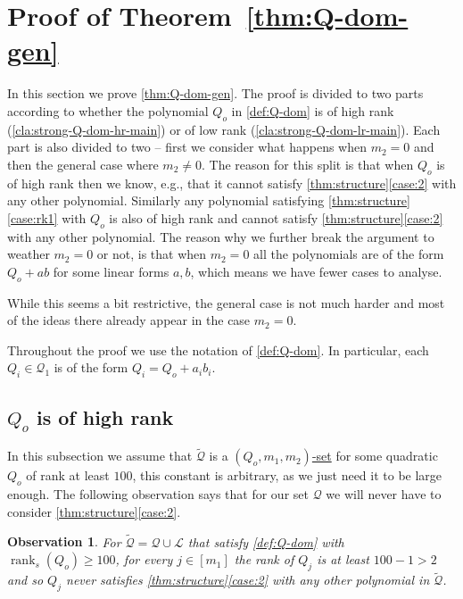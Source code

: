 \documentclass[10pt,a4paper]{article}
\newtheorem{observation}[theorem]{Observation}
\def\rank{\operatorname{rank}}
\newcommand{\calL}{{\mathcal{L}}}
\newcommand{\cQ}{{\mathcal{Q}}}
\newcommand{\rkq}{100}
\begin{document}
\section{Proof of Theorem~\ref{thm:Q-dom-gen}}\label{sec:q-dom}

In this section we prove \autoref{thm:Q-dom-gen}. The proof is divided to two parts according to whether the polynomial $Q_o$ in \autoref{def:Q-dom} is of high rank (\autoref{cla:strong-Q-dom-hr-main}) or of low rank (\autoref{cla:strong-Q-dom-lr-main}). Each part is also divided to two -- first we consider what happens when $m_2=0$ and then the general case where $m_2\neq 0$. The reason for this split is that when $Q_o$ is of high rank then we know, e.g., that it cannot satisfy \autoref{thm:structure}\ref{case:2} with any other polynomial. Similarly any polynomial satisfying \autoref{thm:structure}\ref{case:rk1} with $Q_o$ is also of high rank and cannot satisfy \autoref{thm:structure}\ref{case:2} with any other polynomial. The reason why we further break the argument to weather $m_2=0$ or not, is that when $m_2= 0$ all the polynomials  are of the form $Q_o+ab$ for some linear forms $a,b$, which means we have fewer cases to analyse.

While this seems a bit restrictive, the general case is not much harder and most of the ideas there already appear in the case $m_2=0$. 


Throughout the proof we use the notation of \autoref{def:Q-dom}. In particular, each $Q_i\in\cQ_1$ is of the form $Q_i=Q_o+a_ib_i$.





\subsection{$Q_o$ is of high rank}

In this subsection we assume that $\tilde{\cQ}$ is a \hyperref[def:Q-dom]{$(Q_o,m_1,m_2)$-set} for some quadratic $Q_o$ of rank at least $\rkq$, this constant is arbitrary, as we just need it to be large enough.
The following observation says that for our set $\cQ$ we will never have to consider 
\autoref{thm:structure}\ref{case:2}. 

\begin{observation}\label{obs:case3}
For $\tilde{\cQ} = \cQ \cup \calL$ that satisfy \autoref{def:Q-dom} with $\rank_s(Q_o)\geq \rkq$, for every $j \in [m_1]$ the rank of $Q_j$ is at least $\rkq-1>2$ and so $Q_j$ never satisfies \autoref{thm:structure}\ref{case:2} with any other polynomial in $\tilde{\cQ}$.

\end{observation}
\end{document}
